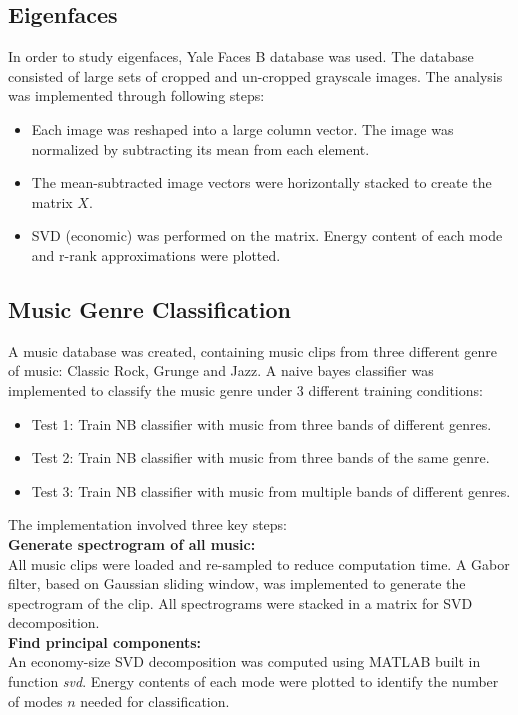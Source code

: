 \documentclass{article}
\begin{document}
\subsection{Eigenfaces}
In order to study eigenfaces, Yale Faces B database was used. The database consisted of large sets of cropped and un-cropped grayscale images. The analysis was implemented through following steps:
\begin{itemize}
\item Each image was reshaped into a large column vector. The image was normalized by subtracting its mean from each element.
\item The mean-subtracted image vectors were horizontally stacked to create the matrix $X$.
\item SVD (economic) was performed on the matrix. Energy content of each mode and r-rank approximations were plotted.
\end{itemize}


\subsection{Music Genre Classification}
A music database was created, containing music clips from three different genre of music: Classic Rock, Grunge and Jazz. A naive bayes classifier was implemented to classify the music genre under 3 different training conditions:
\begin{itemize}
\item Test 1: Train NB classifier with music from three bands of different genres.
\item Test 2: Train NB classifier with music from three bands of the same genre.
\item Test 3: Train NB classifier with music from multiple bands of different genres.
\end{itemize}

The implementation involved three key steps: \\

\textbf{Generate spectrogram of all music:} \\
All music clips were loaded and re-sampled to reduce computation time. A Gabor filter, based on Gaussian sliding window, was implemented to generate the spectrogram of the clip. All spectrograms were stacked in a matrix for SVD decomposition. \\

\textbf{Find principal components:} \\
An economy-size SVD decomposition was computed using MATLAB built in function \emph{svd}. Energy contents of each mode were plotted to identify the number of modes $n$ needed for classification. \\
\end{document}
